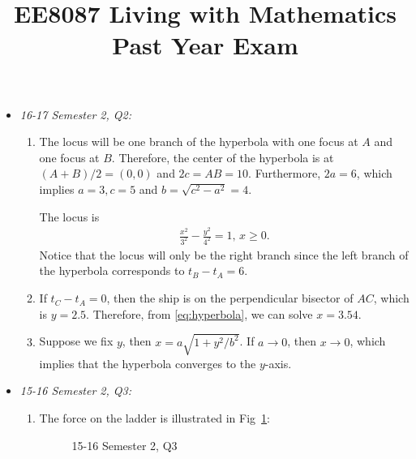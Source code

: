 \documentclass{article}
\title{EE8087 Living with Mathematics\\Past Year Exam}
\date{}
\begin{document}
 \maketitle
\begin{itemize}
\item \emph{16-17 Semester 2, Q2:}
  \begin{enumerate}[label=(\alph*)]
  \item  The locus will be one branch of the hyperbola with one focus at $A$ and one focus at $B$. Therefore, the center of the hyperbola is at $(A+B)/2 = (0,0)$ and $2c = AB = 10$. Furthermore, $2a = 6$, which implies $a = 3, c= 5$ and $b = \sqrt{c^2-a^2} = 4$.

    The locus is
    \begin{align}
      \frac{x^2}{3^2}-\frac{y^2}{4^2} = 1, \,x\geq 0.
      \label{eq:hyperbola}
    \end{align}
    Notice that the locus will only be the right branch since the left branch of the hyperbola corresponds to $t_B-t_A = 6$.
  \item If $t_C-t_A=0$, then the ship is on the perpendicular bisector of $AC$, which is $y = 2.5$. Therefore, from \eqref{eq:hyperbola}, we can solve $x = 3.54$.
  \item Suppose we fix $y$, then $x = a\sqrt{1+y^2/b^2}$. If $a \rightarrow 0$, then $x \rightarrow  0$, which implies that the hyperbola converges to the $y$-axis.
  \end{enumerate}
\item \emph{15-16 Semester 2, Q3:}
  \begin{enumerate}[label=(\alph*)]
\item The force on the ladder is illustrated in Fig~\ref{fig:ladder}:
\begin{figure}[ht]
  \centering

  \caption{15-16 Semester 2, Q3\label{fig:ladder} }
\end{figure}


\end{enumerate}
\end{itemize}
\end{document}
